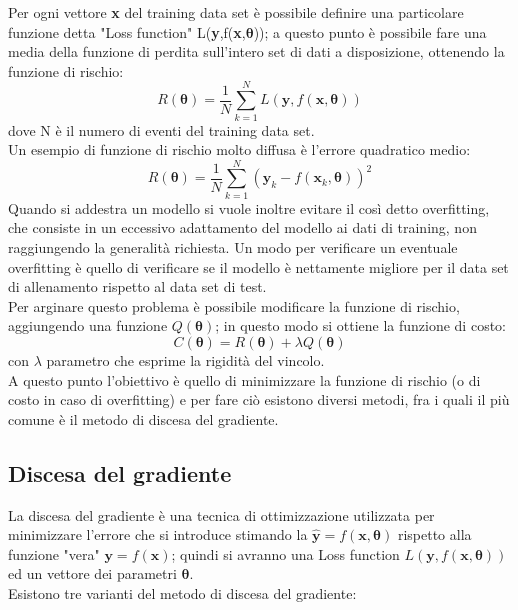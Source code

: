 Per ogni vettore \textbf{x} del training data set è possibile definire una particolare funzione detta "Loss function" L(\textbf{y},f(\textbf{x},$\bm{\theta}$)); a questo punto è possibile fare una media della funzione di perdita sull'intero set di dati a disposizione, ottenendo la funzione di rischio: \\
\begin{equation}
R(\bm{\theta}) = \frac{1}{N}\sum_{k=1}^{N}L(\textbf{y},f(\textbf{x},\bm{\theta}))
\end{equation}
dove N è il numero di eventi del training data set. \\
Un esempio di funzione di rischio molto diffusa è l'errore quadratico medio:
\begin{equation}
R(\bm{\theta}) = \frac{1}{N}\sum_{k=1}^{N}(\textbf{y}_k - f(\textbf{x}_k , \bm{\theta}))^2
\end{equation}
Quando si addestra un modello si vuole inoltre evitare il così detto overfitting, che consiste in un eccessivo adattamento del modello ai dati di training, non raggiungendo la generalità richiesta. Un modo per verificare un eventuale overfitting è quello di verificare se il modello è nettamente migliore per il data set di allenamento rispetto al data set di test. \\
Per arginare questo problema è possibile modificare la funzione di rischio, aggiungendo una funzione $Q(\bm{\theta})$; in questo modo si ottiene la funzione di costo:
\begin{equation}
C(\bm{\theta}) = R(\bm{\theta}) + \lambda Q(\bm{\theta})
\end{equation}
con $\lambda$ parametro che esprime la rigidità del vincolo.\\
A questo punto l'obiettivo è quello di minimizzare la funzione di rischio (o di costo in caso di overfitting) e per fare ciò esistono diversi metodi, fra i quali il più comune è il metodo di discesa del gradiente.

\newpage


\subsection{Discesa del gradiente}
\label{discesa del gradiente}
La discesa del gradiente è una tecnica di ottimizzazione utilizzata per minimizzare l'errore che si introduce stimando la $\hat{\textbf{y}} = f(\textbf{x},\bm{\theta})$ rispetto alla funzione "vera" $\textbf{y} = f(\textbf{x})$; quindi si avranno una Loss function $L(\textbf{y},f(\textbf{x},\bm{\theta}))$ ed un vettore dei parametri $\bm{\theta}$.\\
Esistono tre varianti del metodo di discesa del gradiente:

